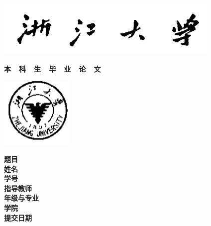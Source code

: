 {
  \setlength{\parindent}{0em}

  {
    \linespread{1}

    \vspace*{-1em}

    \begin{center}
      \includegraphics[width=108mm]{data/cover-zh/xiaoming}
    \end{center}

    \vspace{-1.5em}

    {
      \songti\erhao\bfseries
      \centering
      本~~科~~生~~毕~~业~~论~~文 \par
    }

    \vspace{1em}

    \begin{center}
      \includegraphics[width=35mm]{data/cover-zh/xiaobiao}
    \end{center}
  }

  \vspace{9em}

  {
    \linespread{1.6}
    \songti\sanhao\bfseries
    \centering
    \newlength{\titlelength}
    \setlength{\titlelength}{22em}
    题目 \; \underline{\makebox[\titlelength]{\zjutitlec}} \\
    姓名 \; \underline{\makebox[\titlelength]{\zjuauthornamec}} \\
    学号 \; \underline{\makebox[\titlelength]{\zjuauthorid}} \\
    指导教师 \; \underline{\makebox[\titlelength - 2em]{\zjumentorc}} \\
    年级与专业 \; \underline{\makebox[\titlelength - 3em]{\zjugrade \; \zjumajorc}} \\
    学院 \; \underline{\makebox[\titlelength]{\zjucollegec}} \\
    提交日期 \; \underline{\makebox[\titlelength - 2em]{\zjudatec}} \par
  }
}
